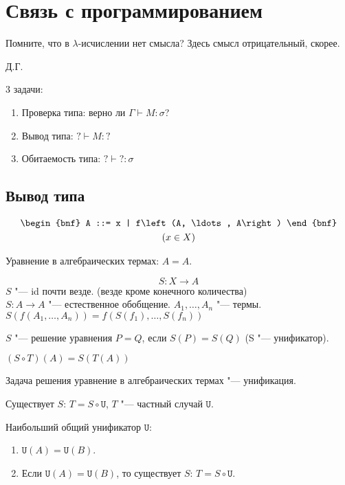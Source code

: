 \section{\texorpdfstring{Связь с программированием}{Link to programming}}

\epigraph{Помните, что в $\lambda$-исчислении нет смысла? Здесь смысл отрицательный, скорее.}{Д.Г.}

3 задачи:
\begin{enumerate}[label=(\asbuk*)]
    \item Проверка типа: верно ли $\Gamma \vdash M : \sigma$?
    \item Вывод типа: $? \vdash M : ?$
    \item Обитаемость типа: $? \vdash ? : \sigma$
\end{enumerate}

\subsection{\texorpdfstring{Вывод типа}{Type deduction}}

\begin{definition}
    \begin{gather*}
        \begin{bnf}
            A ::= x | f\left(A, \ldots, A\right)
        \end{bnf} \\
        (x \in X)
    \end{gather*}
\end{definition}

Уравнение в алгебраических термах: $A = A$.

\begin{definition}[$S$-подстановка]
    \[
        S : X \rightarrow A
    \]
    $S$ "--- id почти везде. (везде кроме конечного количества) \\
    $S : A \rightarrow A$ "--- естественное обобщение. $A_1, \ldots, A_n$ "--- термы.
    $S\left(f\left(A_1, \dots, A_n\right)\right) = f\left(S(f_1), \ldots, S(f_n)\right)$
\end{definition}

\begin{definition}
    $S$ "--- решение уравнения $P=Q$, если $S(P)=S(Q)$ (S "--- унификатор).
\end{definition}
\begin{definition}
    $(S \circ T)(A) = S(T(A))$
\end{definition}
Задача решения уравнение в алгебраических термах "--- унификация.
\begin{definition}
    Существует $S$: $T = S \circ \texttt{U}$, $T$ "--- частный случай $\texttt{U}$.
\end{definition}
\begin{definition}
    Наибольший общий унификатор $\texttt{U}$:
    \begin{enumerate}
        \item $\texttt{U}(A)=\texttt{U}(B)$.
        \item Если $\texttt{U}(A)=\texttt{U}(B)$, то существует $S$: $T = S \circ \texttt{U}$.
    \end{enumerate}
\end{definition}

